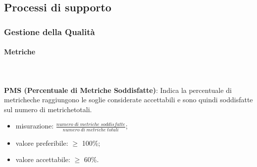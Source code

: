 											
			
	\subsection{Processi di supporto}		
		\subsubsection{Gestione della Qualità}
			\paragraph{Metriche} \mbox{} \\ \\
				\textbf{PMS (Percentuale di Metriche Soddisfatte)}: Indica la percentuale di metriche\glosp che raggiungono le soglie considerate accettabili e sono quindi soddisfatte sul numero di metriche\glosp totali.
				\begin{itemize}
					\item misurazione: $\frac{numero \; di \; metriche \; soddisfatte}{numero \; di \; metriche \; totali}$;
					\item valore preferibile: $\ge$ 100\%;
					\item valore accettabile: $\ge$ 60\%.
				\end{itemize}


		  
			
				

